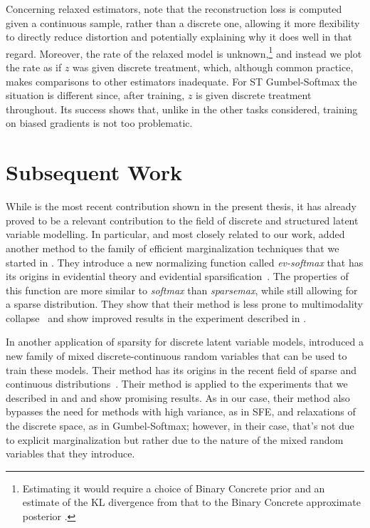 Concerning relaxed estimators, note that the reconstruction loss is
computed given a continuous sample, rather than a discrete one,
allowing it more flexibility to directly reduce distortion and
potentially explaining why it does well in that regard. Moreover, the
rate of the relaxed model is unknown,\footnote{Estimating it would
    require a choice of Binary Concrete prior and an estimate of the KL
    divergence from that to the Binary Concrete approximate posterior
    \citep[Appendix C.3.2]{Concrete}.} and instead we plot the rate as if
$z$ was given discrete treatment, which, although common practice,
makes comparisons to other estimators inadequate. For ST
Gumbel-Softmax the situation is different since, after training, $z$
is given discrete treatment throughout. Its success shows that,
unlike in the other tasks considered, training on biased gradients is
not too problematic.

\section{Subsequent Work}

While \citet{correia2020procneurips} is the most recent contribution
shown in the present thesis, it has already proved to be a relevant
contribution to the field of discrete and structured latent variable
modelling. In particular, and most closely related to our work,
\citet{chen2021EvidentialSoftmaxSparse} added another method to the
family of efficient marginalization techniques that we started in
\citet{correia2020procneurips}. They introduce a new normalizing
function called \emph{ev-softmax} that has its origins in evidential
theory and evidential sparsification~\citep{itkina2020evidential}.
The properties of this function are more similar to \emph{softmax}
than \emph{sparsemax}, while still allowing for a sparse
distribution. They show that their method is less prone to
multimodality collapse~\citep{itkina2020evidential} and show improved
results in the experiment described in .

In another application of sparsity for discrete latent variable
models, \citet{farinhas2022SparseCommunicationMixed} introduced a new
family of mixed discrete-continuous random variables that can be used
to train these models. Their method has its origins in the recent
field of sparse and continuous
distributions~\citep{martins2020SparseContinuousAttention}. Their
method is applied to the experiments that we described in
 and  and show promising
results. As in our case, their method also bypasses the need for
methods with high variance, as in SFE, and relaxations of the
discrete space, as in Gumbel-Softmax; however, in their case, that's
not due to explicit marginalization but rather due to the nature of
the mixed random variables that they introduce.

